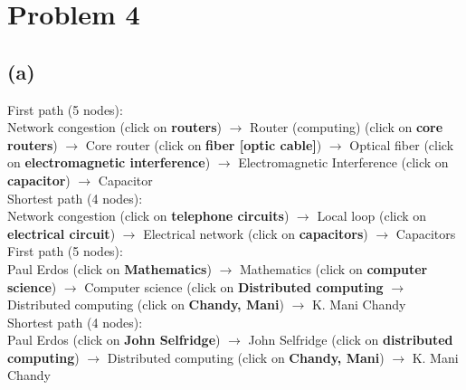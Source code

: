\documentclass{article}
\begin{document}
\section*{Problem 4}
\subsection*{(a)}
First path (5 nodes): \\
Network congestion (click on \textbf{routers}) $\rightarrow$ Router (computing) 
(click on \textbf{core routers}) $\rightarrow$ Core router 
(click on \textbf{fiber [optic cable]}) $\rightarrow$ Optical fiber (click on
\textbf{electromagnetic interference}) $\rightarrow$ Electromagnetic Interference 
(click on \textbf{capacitor}) $\rightarrow$ Capacitor \\

\noindent Shortest path (4 nodes): \\
Network congestion (click on \textbf{telephone circuits}) $\rightarrow$ Local
loop (click on \textbf{electrical circuit}) $\rightarrow$ Electrical network (click
on \textbf{capacitors}) $\rightarrow$ Capacitors \\

\noindent First path (5 nodes): \\
Paul Erdos (click on \textbf{Mathematics}) $\rightarrow$ Mathematics (click on
\textbf{computer science}) $\rightarrow$ Computer science (click on \textbf{
Distributed computing} $\rightarrow$ Distributed computing (click on 
\textbf{Chandy, Mani}) $\rightarrow$ K. Mani Chandy  \\

\noindent Shortest path (4 nodes): \\
Paul Erdos (click on \textbf{John Selfridge}) $\rightarrow$ 
John Selfridge (click on \textbf{distributed computing}) $\rightarrow$
Distributed computing (click on \textbf{Chandy, Mani}) $\rightarrow$ K. Mani Chandy
\end{document}
